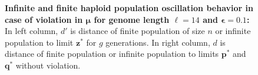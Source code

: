 \begin{figure}[h]
\begin{center}
\hspace{-3em}%
\vspace{-0.5em} \hspace{-3em}%


\caption{\textbf{Infinite and finite haploid population oscillation behavior in case of violation in $\bm{\mu}$ for genome length $\ell = 14$ and $\bm{\epsilon} = 0.1$:} 
  In left column, $d'$ is distance of finite population of size $n$ or infinite population to limit $\bm{z}^\ast$ for $g$ generations. In right column, $d$ is distance of finite population or infinite population to limits $\bm{p}^\ast$ and $\bm{q}^\ast$ without violation.}
\label{oscillation_14h_vio_mu_0.1}
\end{center}
\end{figure}

